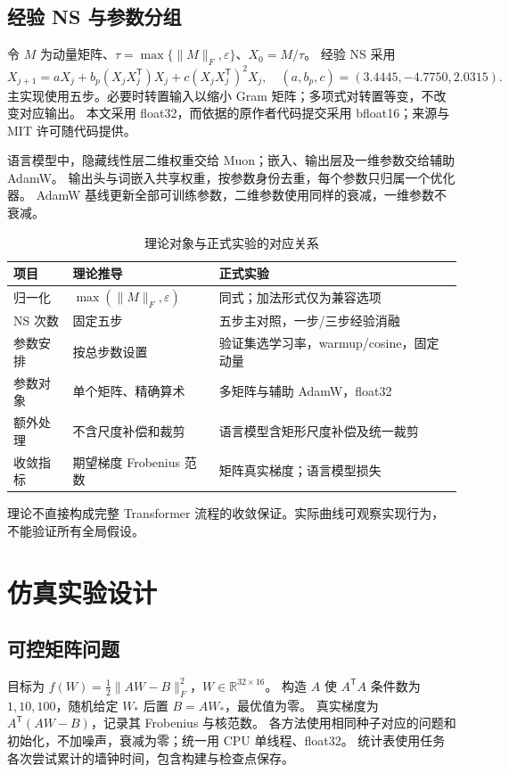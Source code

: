\documentclass[UTF8,a4paper,11pt]{ctexart}
\begin{document}
\subsection{经验 NS 与参数分组}
令 $M$ 为动量矩阵、$\tau=\max\{\|M\|_F,\varepsilon\}$、$X_0=M/\tau$。
经验 NS 采用
\[
 X_{j+1}=aX_j+b_p(X_jX_j^{\mathsf T})X_j+c(X_jX_j^{\mathsf T})^2X_j,
 \quad(a,b_p,c)=(3.4445,-4.7750,2.0315).
\]
主实现使用五步。必要时转置输入以缩小 Gram 矩阵；多项式对转置等变，不改变对应输出。
本文采用 float32，而依据的原作者代码提交采用 bfloat16；来源与 MIT 许可随代码提供。

语言模型中，隐藏线性层二维权重交给 Muon；嵌入、输出层及一维参数交给辅助 AdamW。
输出头与词嵌入共享权重，按参数身份去重，每个参数只归属一个优化器。
AdamW 基线更新全部可训练参数，二维参数使用同样的衰减，一维参数不衰减。

\begin{table}[ht]\centering\small
\caption{理论对象与正式实验的对应关系}
\begin{tabularx}{\linewidth}{lXX}\toprule
项目 & 理论推导 & 正式实验\\\midrule
归一化 & $\max(\|M\|_F,\varepsilon)$ & 同式；加法形式仅为兼容选项\\
NS 次数 & 固定五步 & 五步主对照，一步/三步经验消融\\
参数安排 & 按总步数设置 & 验证集选学习率，warmup/cosine，固定动量\\
参数对象 & 单个矩阵、精确算术 & 多矩阵与辅助 AdamW，float32\\
额外处理 & 不含尺度补偿和裁剪 & 语言模型含矩形尺度补偿及统一裁剪\\
收敛指标 & 期望梯度 Frobenius 范数 & 矩阵真实梯度；语言模型损失\\\bottomrule
\end{tabularx}\end{table}
理论不直接构成完整 Transformer 流程的收敛保证。实际曲线可观察实现行为，不能验证所有全局假设。



\section{仿真实验设计}
\subsection{可控矩阵问题}
目标为 $f(W)=\frac12\|AW-B\|_F^2$，$W\in\mathbb R^{32\times16}$。
构造 $A$ 使 $A^{\mathsf T}A$ 条件数为 $1,10,100$，随机给定 $W_*$ 后置 $B=AW_*$，最优值为零。
真实梯度为 $A^{\mathsf T}(AW-B)$，记录其 Frobenius 与核范数。
各方法使用相同种子对应的问题和初始化，不加噪声，衰减为零；统一用 CPU 单线程、float32。
统计表使用任务各次尝试累计的墙钟时间，包含构建与检查点保存。
\end{document}
